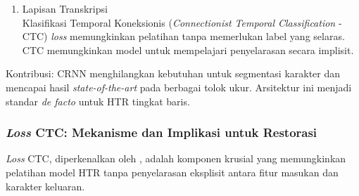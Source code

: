 \documentclass[12pt,a4paper]{article}
\begin{document}
\begin{enumerate}[leftmargin=*, labelindent=0pt, itemsep=1ex, topsep=0pt]
\begin{enumerate}[leftmargin=1.5em, labelsep=0.5em, itemindent=0pt, label=\alph*., topsep=0pt, parsep=0pt, itemsep=0pt]
      \item Lapisan Transkripsi \mbox{}\\[0.1em]
            Klasifikasi Temporal Koneksionis (\textit{Connectionist Temporal Classification} - CTC) \textit{loss} memungkinkan pelatihan tanpa memerlukan label yang selaras. CTC memungkinkan model untuk mempelajari penyelarasan secara implisit.
\end{enumerate}

Kontribusi: CRNN menghilangkan kebutuhan untuk segmentasi karakter dan mencapai hasil \textit{state-of-the-art} pada berbagai tolok ukur. Arsitektur ini menjadi standar \textit{de facto} untuk HTR tingkat baris.

\end{enumerate}

\subsubsection{\textit{Loss} CTC: Mekanisme dan Implikasi untuk Restorasi}
\label{subsubsec:ctc-loss}

\textit{Loss} CTC, diperkenalkan oleh \parencite{graves2006}, adalah komponen krusial yang memungkinkan pelatihan model HTR tanpa penyelarasan eksplisit antara fitur masukan dan karakter keluaran.
\end{document}
